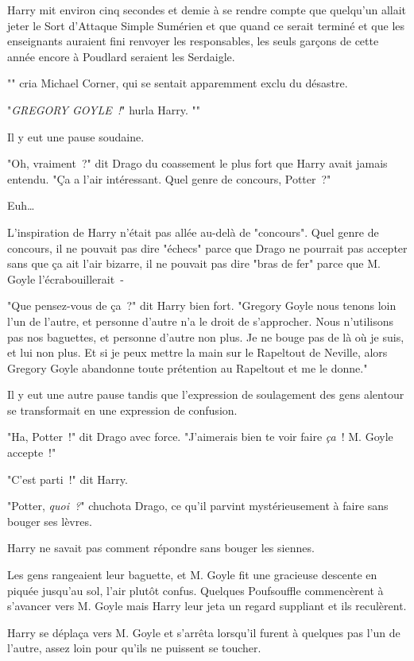 Harry mit environ cinq secondes et demie à se rendre compte que quelqu'un allait jeter le Sort d'Attaque Simple Sumérien et que quand ce serait terminé et que les enseignants auraient fini renvoyer les responsables, les seuls garçons de cette année encore à Poudlard seraient les Serdaigle.

"" cria Michael Corner, qui se sentait apparemment exclu du désastre.

"\emph{GREGORY GOYLE~!}" hurla Harry. ""

Il y eut une pause soudaine.

"Oh, vraiment~?" dit Drago du coassement le plus fort que Harry avait jamais entendu. "Ça a l'air intéressant. Quel genre de concours, Potter~?"

Euh…

L'inspiration de Harry n'était pas allée au-delà de "concours". Quel genre de concours, il ne pouvait pas dire "échecs" parce que Drago ne pourrait pas accepter sans que ça ait l'air bizarre, il ne pouvait pas dire "bras de fer" parce que M. Goyle l'écrabouillerait~-

"Que pensez-vous de ça~?" dit Harry bien fort. "Gregory Goyle nous tenons loin l'un de l'autre, et personne d'autre n'a le droit de s'approcher. Nous n'utilisons pas nos baguettes, et personne d'autre non plus. Je ne bouge pas de là où je suis, et lui non plus. Et si je peux mettre la main sur le Rapeltout de Neville, alors Gregory Goyle abandonne toute prétention au Rapeltout et me le donne."

Il y eut une autre pause tandis que l'expression de soulagement des gens alentour se transformait en une expression de confusion.

"Ha, Potter~!" dit Drago avec force. "J'aimerais bien te voir faire \emph{ça}~! M. Goyle accepte~!"

"C'est parti~!" dit Harry.

"Potter, \emph{quoi~?}" chuchota Drago, ce qu'il parvint mystérieusement à faire sans bouger ses lèvres.

Harry ne savait pas comment répondre sans bouger les siennes.

Les gens rangeaient leur baguette, et M. Goyle fit une gracieuse descente en piquée jusqu'au sol, l'air plutôt confus. Quelques Poufsouffle commencèrent à s'avancer vers M. Goyle mais Harry leur jeta un regard suppliant et ils reculèrent.

Harry se déplaça vers M. Goyle et s'arrêta lorsqu'il furent à quelques pas l'un de l'autre, assez loin pour qu'ils ne puissent se toucher.

